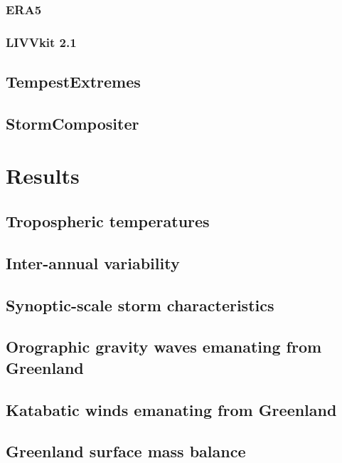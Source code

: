 \documentclass[draft]{agujournal2019}
\begin{document}
\subsubsection{ERA5}
\subsubsection{LIVVkit 2.1}
\subsection{TempestExtremes}
\subsection{StormCompositer}

\section{Results}\label{sec:results}

\subsection{Tropospheric temperatures}
\subsection{Inter-annual variability}
\subsection{Synoptic-scale storm characteristics}
\subsection{Orographic gravity waves emanating from Greenland}
\subsection{Katabatic winds emanating from Greenland}
\subsection{Greenland surface mass balance}

%
%
%
%
\end{document}
